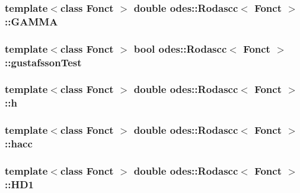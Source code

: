 \hypertarget{classodes_1_1Rodascc_afb343f5b63a151d719ad7d1595381d72}{
\subsubsection[{G\-A\-M\-M\-A}]{\setlength{\rightskip}{0pt plus 5cm}template$<$class Fonct $>$ double {\bf odes\-::\-Rodascc}$<$ Fonct $>$\-::G\-A\-M\-M\-A\hspace{0.3cm}{\ttfamily [private]}}}\label{classodes_1_1Rodascc_afb343f5b63a151d719ad7d1595381d72}
\hypertarget{classodes_1_1Rodascc_a2b88fdd1f27aa4bc5a7f909e2a5f7d84}{
\subsubsection[{gustafsson\-Test}]{\setlength{\rightskip}{0pt plus 5cm}template$<$class Fonct $>$ bool {\bf odes\-::\-Rodascc}$<$ Fonct $>$\-::gustafsson\-Test\hspace{0.3cm}{\ttfamily [private]}}}\label{classodes_1_1Rodascc_a2b88fdd1f27aa4bc5a7f909e2a5f7d84}
\hypertarget{classodes_1_1Rodascc_a4172a314be9139f7468676ddfeeffe5d}{
\subsubsection[{h}]{\setlength{\rightskip}{0pt plus 5cm}template$<$class Fonct $>$ double {\bf odes\-::\-Rodascc}$<$ Fonct $>$\-::h\hspace{0.3cm}{\ttfamily [private]}}}\label{classodes_1_1Rodascc_a4172a314be9139f7468676ddfeeffe5d}
\hypertarget{classodes_1_1Rodascc_a39d838a99570eb08ee493effd0bf431c}{
\subsubsection[{hacc}]{\setlength{\rightskip}{0pt plus 5cm}template$<$class Fonct $>$ double {\bf odes\-::\-Rodascc}$<$ Fonct $>$\-::hacc\hspace{0.3cm}{\ttfamily [private]}}}\label{classodes_1_1Rodascc_a39d838a99570eb08ee493effd0bf431c}
\hypertarget{classodes_1_1Rodascc_a5f13e999d1e6adca2c1a978b24f44966}{
\subsubsection[{H\-D1}]{\setlength{\rightskip}{0pt plus 5cm}template$<$class Fonct $>$ double {\bf odes\-::\-Rodascc}$<$ Fonct $>$\-::H\-D1\hspace{0.3cm}{\ttfamily [private]}}}\label{classodes_1_1Rodascc_a5f13e999d1e6adca2c1a978b24f44966}
